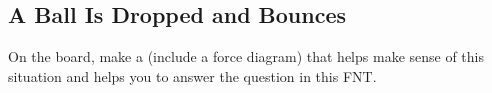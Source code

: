 \subsection{A Ball Is Dropped and Bounces}
\label{act7.2.2-5}

\begin{fnt}
	
\end{fnt}

\noindent On the board, make a \pchart{} (include a force diagram) that helps make sense of this situation and helps you to answer the question in this FNT.

\vspace{6pt}
\WCD









 
